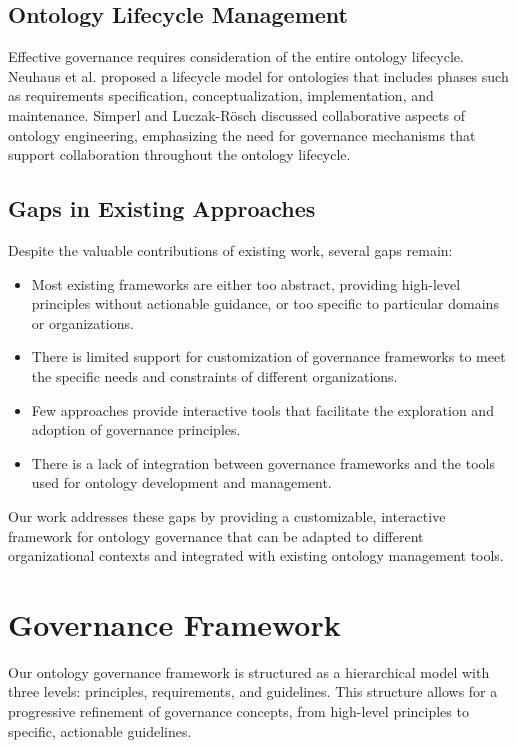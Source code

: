 \documentclass[conference]{IEEEtran}
\begin{document}
\subsection{Ontology Lifecycle Management}

Effective governance requires consideration of the entire ontology lifecycle. Neuhaus et al. \cite{neuhaus2013towards} proposed a lifecycle model for ontologies that includes phases such as requirements specification, conceptualization, implementation, and maintenance. Simperl and Luczak-Rösch \cite{simperl2014collaborative} discussed collaborative aspects of ontology engineering, emphasizing the need for governance mechanisms that support collaboration throughout the ontology lifecycle.

\subsection{Gaps in Existing Approaches}

Despite the valuable contributions of existing work, several gaps remain:

\begin{itemize}
    \item Most existing frameworks are either too abstract, providing high-level principles without actionable guidance, or too specific to particular domains or organizations.
    \item There is limited support for customization of governance frameworks to meet the specific needs and constraints of different organizations.
    \item Few approaches provide interactive tools that facilitate the exploration and adoption of governance principles.
    \item There is a lack of integration between governance frameworks and the tools used for ontology development and management.
\end{itemize}

Our work addresses these gaps by providing a customizable, interactive framework for ontology governance that can be adapted to different organizational contexts and integrated with existing ontology management tools.

\section{Governance Framework}
\label{sec:framework}

Our ontology governance framework is structured as a hierarchical model with three levels: principles, requirements, and guidelines. This structure allows for a progressive refinement of governance concepts, from high-level principles to specific, actionable guidelines.
\end{document}
